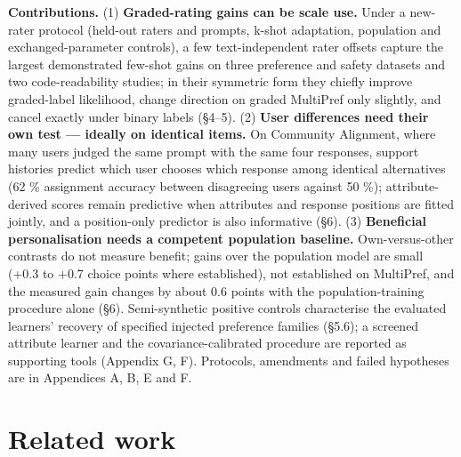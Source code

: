 \documentclass{article}
\begin{document}
\textbf{Contributions.} (1) \textbf{Graded-rating gains can be scale use.} Under a new-rater protocol (held-out raters and prompts, k-shot adaptation, population and exchanged-parameter controls), a few text-independent rater offsets capture the largest demonstrated few-shot gains on three preference and safety datasets and two code-readability studies; in their symmetric form they chiefly improve graded-label likelihood, change direction on graded MultiPref only slightly, and cancel exactly under binary labels (\S{}4--5). (2) \textbf{User differences need their own test --- ideally on identical items.} On Community Alignment, where many users judged the same prompt with the same four responses, support histories predict which user chooses which response among identical alternatives (62 \% assignment accuracy between disagreeing users against 50 \%); attribute-derived scores remain predictive when attributes and response positions are fitted jointly, and a position-only predictor is also informative (\S{}6). (3) \textbf{Beneficial personalisation needs a competent population baseline.} Own-versus-other contrasts do not measure benefit; gains over the population model are small (+0.3 to +0.7 choice points where established), not established on MultiPref, and the measured gain changes by about 0.6 points with the population-training procedure alone (\S{}6). Semi-synthetic positive controls characterise the evaluated learners' recovery of specified injected preference families (\S{}5.6); a screened attribute learner and the covariance-calibrated procedure are reported as supporting tools (Appendix G, F). Protocols, amendments and failed hypotheses are in Appendices A, B, E and F.

\section{Related work}
\end{document}
